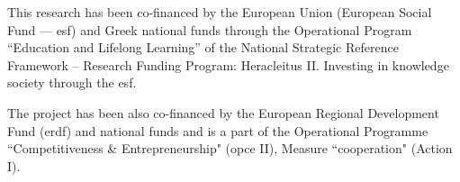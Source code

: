 \documentclass[conference]{llncs}
\begin{document}
This research has been co-financed by the European Union (European Social Fund
--– {\sc esf}) and Greek national funds through the Operational Program
``Education and Lifelong Learning'' of the National Strategic Reference Framework –
Research Funding Program: Heracleitus II. Investing in knowledge society
through the {\sc esf}.

The project has been also co-financed by the European Regional Development Fund ({\sc erdf})
and national funds and is a part of the Operational Programme ``Competitiveness \&
Entrepreneurship" ({\sc opce} II), Measure ``{\sc cooperation}" (Action I).


 
\end{document}

